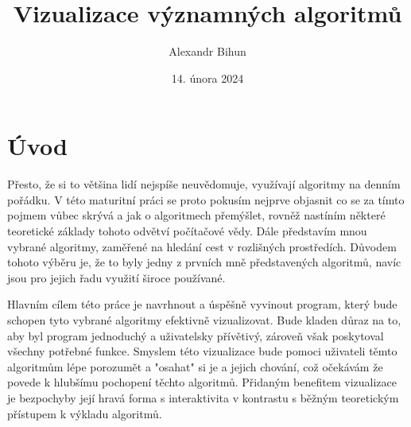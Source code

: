 \documentclass[12pt]{report}			%
\author{Alexandr Bihun}
\title{Vizualizace významných algoritmů}
\date{14. února 2024}
\begin{document}
	\mytitlepage						%
	
	
	
	
   {\tableofcontents\newpage}			%
	
	\chapter*{Úvod}
	Přesto, že si to většina lidí nejspíše neuvědomuje, využívají algoritmy na denním pořádku. 
	V této maturitní práci se proto pokusím nejprve objasnit co se za tímto pojmem vůbec skrývá a jak o algoritmech přemýšlet, rovněž nastíním některé teoretické základy tohoto odvětví počítačové vědy.
	Dále představím mnou vybrané algoritmy, zaměřené na hledání cest v rozlišných prostředích. Důvodem tohoto výběru je, že to byly jedny z prvních mně představených algoritmů, navíc jsou pro jejich řadu využití široce používané.
	 
	 	
Hlavním cílem této práce je navrhnout a úspěšně vyvinout program, který bude schopen tyto vybrané algoritmy efektivně vizualizovat. Bude kladen důraz na to, aby byl program jednoduchý a uživatelsky přívětivý, zároveň však poskytoval všechny potřebné funkce. Smyslem této vizualizace bude pomoci uživateli těmto algoritmům lépe porozumět a "osahat" si je a jejich chování, což očekávám že povede k hlubšímu pochopení těchto algoritmů. Přidaným benefitem vizualizace je bezpochyby její hravá forma s interaktivita
v kontrastu s běžným teoretickým přístupem k výkladu algoritmů.
\end{document}

